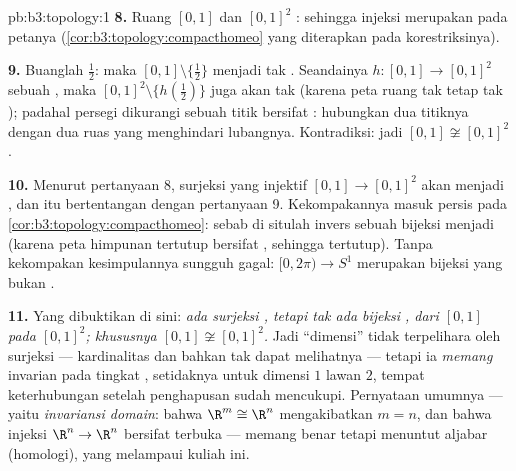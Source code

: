 \begin{solution}{pb:b3:topology:1}
\textbf{8.} Ruang $[0,1]$  dan $[0,1]^2$ : sehingga
injeksi  merupakan  pada petanya
(\cref{cor:b3:topology:compacthomeo} yang diterapkan pada korestriksinya).

\textbf{9.} Buanglah $\frac12$: maka $[0,1]\setminus\{\frac12\}$ menjadi
tak . Seandainya $h \colon [0,1] \to [0,1]^2$ sebuah
, maka $[0,1]^2\setminus\{h(\frac12)\}$ juga akan
tak  (karena peta  ruang tak 
tetap tak ); padahal persegi dikurangi sebuah titik bersifat
: hubungkan dua titiknya dengan  dua ruas yang menghindari
lubangnya. Kontradiksi: jadi $[0,1] \not\cong [0,1]^2$.

\textbf{10.} Menurut pertanyaan 8, surjeksi  yang injektif
$[0,1] \to [0,1]^2$ akan menjadi , dan itu bertentangan dengan
pertanyaan 9. Kekompakannya masuk persis pada
\cref{cor:b3:topology:compacthomeo}: sebab di situlah invers sebuah
bijeksi  menjadi  (karena peta himpunan tertutup
bersifat , sehingga tertutup). Tanpa kekompakan
kesimpulannya sungguh gagal: $[0, 2\pi) \to S^1$ merupakan bijeksi
 yang bukan .

\textbf{11.} Yang dibuktikan di sini: \emph{ada surjeksi
, tetapi tak ada bijeksi , dari $[0,1]$ pada
$[0,1]^2$; khususnya $[0,1] \not\cong [0,1]^2$.} Jadi
``dimensi'' tidak terpelihara oleh surjeksi  ---
kardinalitas dan bahkan  tak dapat melihatnya --- tetapi ia
\emph{memang} invarian  pada tingkat
, setidaknya untuk dimensi $1$ lawan $2$, tempat
keterhubungan setelah penghapusan sudah mencukupi. Pernyataan umumnya
--- yaitu \emph{invariansi domain}: bahwa $\R^m \cong \R^n$ mengakibatkan $m =
n$, dan bahwa injeksi  $\R^n \to \R^n$ bersifat terbuka ---
memang benar tetapi menuntut  aljabar (homologi), yang melampaui
kuliah ini.


\end{solution}
